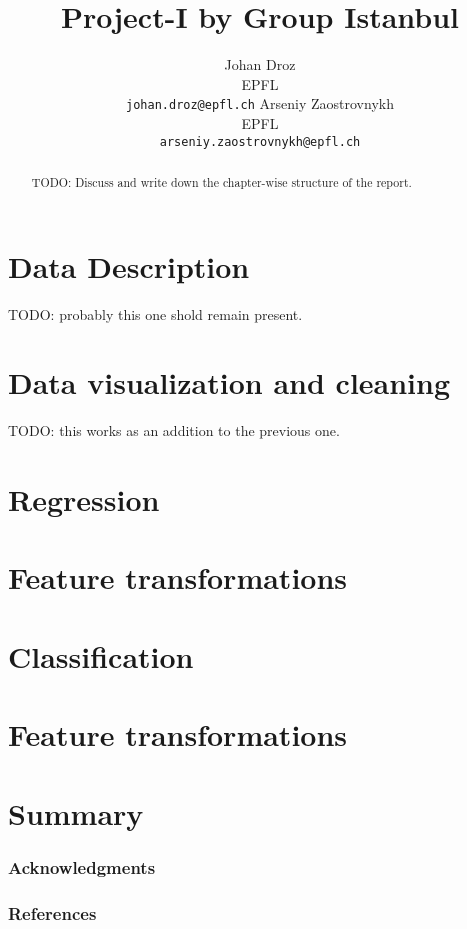 \documentclass{article} %
\title{Project-I by Group Istanbul}
\author{
Johan Droz\\
EPFL \\
\texttt{johan.droz@epfl.ch} \And
Arseniy Zaostrovnykh\\
EPFL \\
\texttt{arseniy.zaostrovnykh@epfl.ch}
}
\newcommand{\todo}[1]{}
\renewcommand{\todo}[1]{{\color{red} TODO: {#1}}}
\begin{document}
\maketitle

\begin{abstract}
\todo{Discuss and write down the chapter-wise structure of the report.}
\end{abstract}

\section{Data Description}
\todo{probably this one shold remain present.}

\section{Data visualization and cleaning}
\todo{this works as an addition to the previous one.}


\section{Regression}
\section{Feature transformations}


\section{Classification}
\section{Feature transformations}


\section{Summary}

\subsubsection*{Acknowledgments}

\subsubsection*{References}
\end{document}
